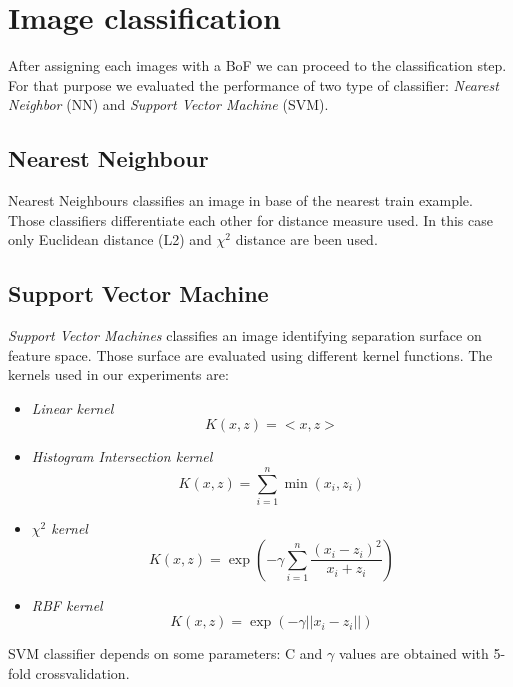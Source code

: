 \section{Image classification}

After assigning each images with a BoF we can proceed to the classification step. For that purpose we evaluated the performance of two type of classifier: \emph{Nearest Neighbor} (NN) and \emph{Support Vector Machine} (SVM).

\subsection{Nearest Neighbour}

Nearest Neighbours classifies an image in base of the nearest train example. Those classifiers differentiate each other for distance measure used. In this case only Euclidean distance (L2) and $\chi^2$ distance are been used.

\subsection{Support Vector Machine}

\emph{Support Vector Machines} classifies an image identifying separation surface on feature space. Those surface are evaluated using different kernel functions. The kernels used in our experiments are:
\begin{itemize}
\item \emph{Linear kernel}
\begin{equation}
K(x, z) = <x, z>
\end{equation}
\item \emph{Histogram Intersection kernel}
\begin{equation}
K(x, z) = \sum_{i = 1}^{n} \min (x_i, z_i)
\end{equation}
\item \emph{$\chi^2$ kernel}
\begin{equation}
K(x, z) = \exp (-\gamma \sum_{i = 1}^{n} \frac{(x_i - z_i)^2}{x_i + z_i})
\end{equation}
\item \emph{RBF kernel}
\begin{equation}
K(x, z) = \exp (- \gamma ||x_i - z_i||)
\end{equation}
\end{itemize}
SVM classifier depends on some parameters: C and $\gamma$ values are obtained with 5-fold crossvalidation.